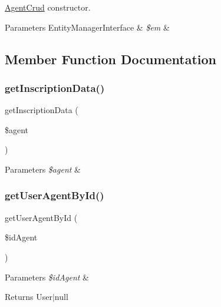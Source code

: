 \mbox{\hyperlink{class_app_1_1_d_a_l_1_1_agent_crud}{Agent\+Crud}} constructor. 
\begin{DoxyParams}[1]{Parameters}
Entity\+Manager\+Interface & {\em \$em} & \\
\hline
\end{DoxyParams}


\subsection{Member Function Documentation}
\mbox{\label{class_app_1_1_d_a_l_1_1_agent_crud_a98ddf8e568810488fd589cab24b8782d}} 
\subsubsection{\texorpdfstring{getInscriptionData()}{getInscriptionData()}}
{\footnotesize\ttfamily get\+Inscription\+Data (\begin{DoxyParamCaption}\item[{}]{\$agent }\end{DoxyParamCaption})}


\begin{DoxyParams}{Parameters}
{\em \$agent} & \\
\hline
\end{DoxyParams}
\mbox{\label{class_app_1_1_d_a_l_1_1_agent_crud_a82bc20c060e0b47814cec5250effe51b}} 
\subsubsection{\texorpdfstring{getUserAgentById()}{getUserAgentById()}}
{\footnotesize\ttfamily get\+User\+Agent\+By\+Id (\begin{DoxyParamCaption}\item[{}]{\$id\+Agent }\end{DoxyParamCaption})}


\begin{DoxyParams}{Parameters}
{\em \$id\+Agent} & \\
\hline
\end{DoxyParams}
\begin{DoxyReturn}{Returns}
User$\vert$null 
\end{DoxyReturn}
\mbox{\label{class_app_1_1_d_a_l_1_1_agent_crud_a6a57a8759329d23af8df40c5ec5494f4}} 
